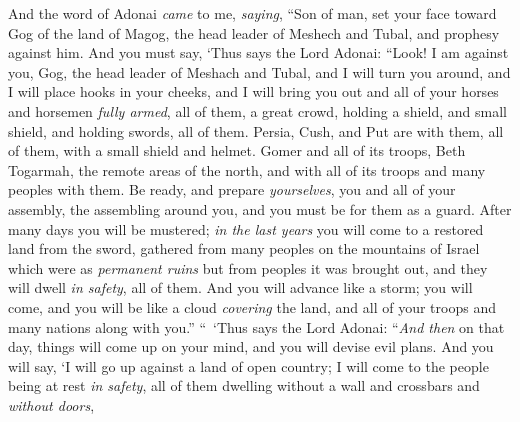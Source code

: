 \begin{biblechapter} %
 And the word of Adonai \textit{came} to me, \textit{saying},
\verse “Son of man, set your face toward Gog of the land of Magog, the head leader of Meshech and Tubal, and prophesy against him.
\verse And you must say, ‘Thus says the Lord Adonai: “Look! I am against you, Gog, the head leader of Meshach and Tubal,
\verse and I will turn you around, and I will place hooks in your cheeks, and I will bring you out and all of your horses and horsemen \textit{fully armed}, all of them, a great crowd, holding a shield, and small shield, and holding swords, all of them.
\verse Persia, Cush, and Put are with them, all of them, with a small shield and helmet.
\verse Gomer and all of its troops, Beth Togarmah, the remote areas of the north, and with all of its troops and many peoples with them.
\verse Be ready, and prepare \textit{yourselves}, you and all of your assembly, the assembling around you, and you must be for them as a guard.
\verse After many days you will be mustered; \textit{in the last years} you will come to a restored land from the sword, gathered from many peoples on the mountains of Israel which were as \textit{permanent ruins} but from peoples it was brought out, and they will dwell \textit{in safety}, all of them.
\verse And you will advance like a storm; you will come, and you will be like a cloud \textit{covering} the land, and all of your troops and many nations along with you.”
\verse “ ‘Thus says the Lord Adonai: “\textit{And then} on that day, things will come up on your mind, and you will devise evil plans.
\verse And you will say, ‘I will go up against a land of open country; I will come to the people being at rest \textit{in safety}, all of them dwelling without a wall and crossbars and \textit{without doors},

\end{biblechapter}
